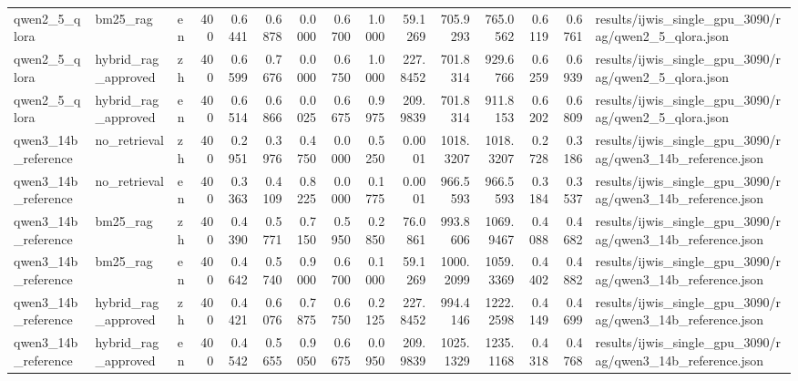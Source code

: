 \begin{tabular}{lllrrrrrrrrrrrl}
qwen2_5_qlora & bm25_rag & en & 400 & 0.6441 & 0.6878 & 0.0000 & 0.6700 & 1.0000 & 59.1269 & 705.9293 & 765.0562 & 0.6119 & 0.6761 & results/ijwis_single_gpu_3090/rag/qwen2_5_qlora.json \\
qwen2_5_qlora & hybrid_rag_approved & zh & 400 & 0.6599 & 0.7676 & 0.0000 & 0.6750 & 1.0000 & 227.8452 & 701.8314 & 929.6766 & 0.6259 & 0.6939 & results/ijwis_single_gpu_3090/rag/qwen2_5_qlora.json \\
qwen2_5_qlora & hybrid_rag_approved & en & 400 & 0.6514 & 0.6866 & 0.0025 & 0.6675 & 0.9975 & 209.9839 & 701.8314 & 911.8153 & 0.6202 & 0.6809 & results/ijwis_single_gpu_3090/rag/qwen2_5_qlora.json \\
qwen3_14b_reference & no_retrieval & zh & 400 & 0.2951 & 0.3976 & 0.4750 & 0.0000 & 0.5250 & 0.0001 & 1018.3207 & 1018.3207 & 0.2728 & 0.3186 & results/ijwis_single_gpu_3090/rag/qwen3_14b_reference.json \\
qwen3_14b_reference & no_retrieval & en & 400 & 0.3363 & 0.4109 & 0.8225 & 0.0000 & 0.1775 & 0.0001 & 966.5593 & 966.5593 & 0.3184 & 0.3537 & results/ijwis_single_gpu_3090/rag/qwen3_14b_reference.json \\
qwen3_14b_reference & bm25_rag & zh & 400 & 0.4390 & 0.5771 & 0.7150 & 0.5950 & 0.2850 & 76.0861 & 993.8606 & 1069.9467 & 0.4088 & 0.4682 & results/ijwis_single_gpu_3090/rag/qwen3_14b_reference.json \\
qwen3_14b_reference & bm25_rag & en & 400 & 0.4642 & 0.5740 & 0.9000 & 0.6700 & 0.1000 & 59.1269 & 1000.2099 & 1059.3369 & 0.4402 & 0.4882 & results/ijwis_single_gpu_3090/rag/qwen3_14b_reference.json \\
qwen3_14b_reference & hybrid_rag_approved & zh & 400 & 0.4421 & 0.6076 & 0.7875 & 0.6750 & 0.2125 & 227.8452 & 994.4146 & 1222.2598 & 0.4149 & 0.4699 & results/ijwis_single_gpu_3090/rag/qwen3_14b_reference.json \\
qwen3_14b_reference & hybrid_rag_approved & en & 400 & 0.4542 & 0.5655 & 0.9050 & 0.6675 & 0.0950 & 209.9839 & 1025.1329 & 1235.1168 & 0.4318 & 0.4768 & results/ijwis_single_gpu_3090/rag/qwen3_14b_reference.json \\
\bottomrule
\end{tabular}
